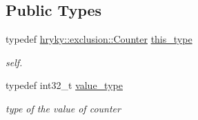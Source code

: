 \subsection*{Public Types}
\begin{DoxyCompactItemize}
\item 
\hypertarget{classhryky_1_1exclusion_1_1_counter_ac9fa4c6c71b57ad8d8f32aa91fd4d9be}{typedef \hyperlink{classhryky_1_1exclusion_1_1_counter}{hryky\-::exclusion\-::\-Counter} \hyperlink{classhryky_1_1exclusion_1_1_counter_ac9fa4c6c71b57ad8d8f32aa91fd4d9be}{this\-\_\-type}}\label{classhryky_1_1exclusion_1_1_counter_ac9fa4c6c71b57ad8d8f32aa91fd4d9be}

\begin{DoxyCompactList}\small\item\em self. \end{DoxyCompactList}\item 
\hypertarget{classhryky_1_1exclusion_1_1_counter_ab326191a15b6c67f8071a7a2b138d1f0}{typedef int32\-\_\-t \hyperlink{classhryky_1_1exclusion_1_1_counter_ab326191a15b6c67f8071a7a2b138d1f0}{value\-\_\-type}}\label{classhryky_1_1exclusion_1_1_counter_ab326191a15b6c67f8071a7a2b138d1f0}

\begin{DoxyCompactList}\small\item\em type of the value of counter \end{DoxyCompactList}\end{DoxyCompactItemize}
